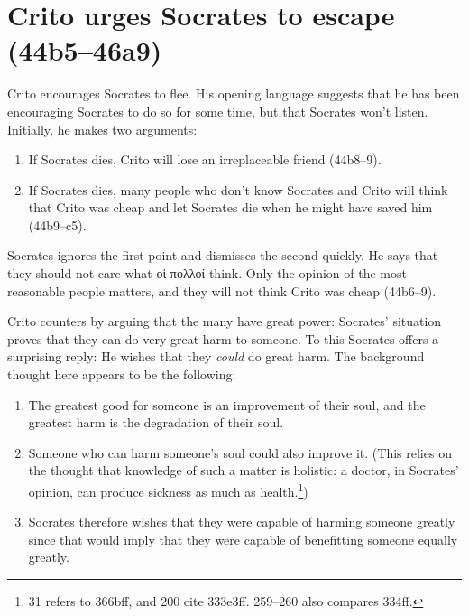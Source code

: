 \documentclass[11pt]{article}
\begin{document}
\section{Crito urges Socrates to escape (44b5--46a9)}

Crito encourages Socrates to flee.  His opening language suggests that he has been encouraging Socrates to do so for some time, but that Socrates won't listen.  Initially, he makes two arguments:

\begin{enumerate}
    \item If Socrates dies, Crito will lose an irreplaceable friend (44b8--9).
    \item If Socrates dies, many people who don't know Socrates and Crito will think that Crito was cheap and let Socrates die when he might have saved him (44b9--c5).
\end{enumerate}

Socrates ignores the first point and dismisses the second quickly.  He says that they should not care what οἱ πολλοί think. Only the opinion of the most reasonable people matters, and they will not think Crito was cheap (44b6--9).

Crito counters by arguing that the many have great power:  Socrates' situation proves that they can do very great harm to someone.  To this Socrates offers a surprising reply: He wishes that they \emph{could} do great harm.  The background thought here appears to be the following:

\begin{enumerate}
    \item The greatest good for someone is an improvement of their soul, and the greatest harm is the degradation of their soul.
    \item Someone who can harm someone's soul could also improve it.  (This relies on the thought that knowledge of such a matter is holistic: a doctor, in Socrates' opinion, can produce sickness as much as health.\footnote{\citet{adam1988} 31 refers to  366bff, and \citet{brickhouse2004} 200 cite  333e3ff.  \citet{burnet1924} 259--260 also compares  334ff.})
    \item Socrates therefore wishes that they were capable of harming someone greatly since that would imply that they were capable of benefitting someone equally greatly.
\end{enumerate}
\end{document}
